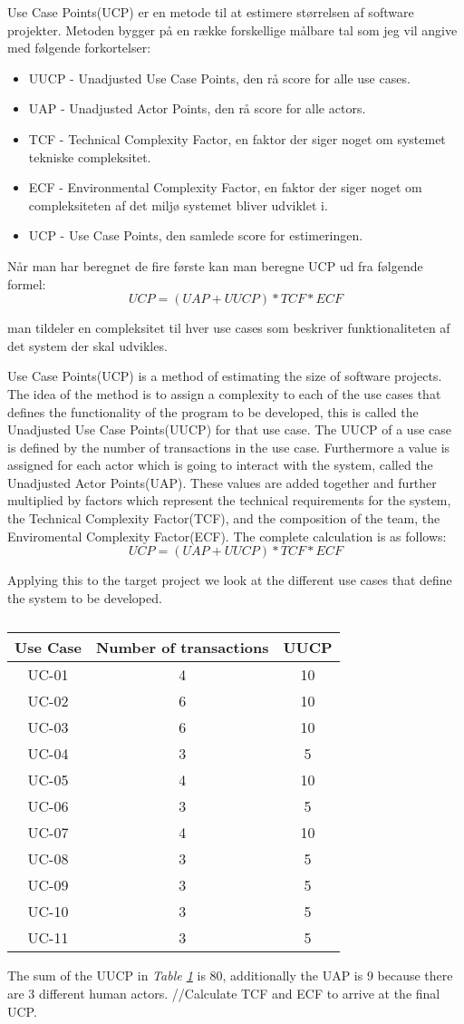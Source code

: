\documentclass[../report.tex]{subfiles}
\begin{document}
Use Case Points(UCP) er en metode til at estimere størrelsen af software projekter. Metoden bygger på en række forskellige målbare tal som jeg vil angive med følgende forkortelser:
\begin{itemize}
\item UUCP - Unadjusted Use Case Points, den rå score for alle use cases.
\item UAP - Unadjusted Actor Points, den rå score for alle actors.
\item TCF - Technical Complexity Factor, en faktor der siger noget om systemet tekniske compleksitet.
\item ECF - Environmental Complexity Factor, en faktor der siger noget om compleksiteten af det miljø systemet bliver udviklet i.
\item UCP - Use Case Points, den samlede score for estimeringen.
\end{itemize}
Når man har beregnet de fire første kan man beregne UCP ud fra følgende formel:\[UCP = (UAP + UUCP)*TCF*ECF\]

man tildeler en compleksitet til hver use cases som beskriver funktionaliteten af det system der skal udvikles. 

Use Case Points(UCP) is a method of estimating the size of software projects. The idea of the method is to assign a complexity to each of the use cases that defines the functionality of the  program to be developed, this is called the Unadjusted Use Case Points(UUCP) for that use case. The UUCP of a use case is defined by the number of transactions in the use case. Furthermore a value is assigned for each actor which is going to interact with the system, called the Unadjusted Actor Points(UAP). These values are added together and further multiplied by factors which represent the technical requirements for the system, the Technical Complexity Factor(TCF), and the composition of the team, the Enviromental Complexity Factor(ECF). The complete calculation is as follows: \[UCP = (UAP + UUCP)*TCF*ECF\] 

Applying this to the target project we look at the different use cases that define the system to be developed. 
\begin{table}[!h] 
\begin{tabular}{|c|c|c|}
\hline Use Case & Number of transactions & UUCP  \\ 
\hline UC-01 & 4 & 10  \\ 
\hline UC-02 & 6 & 10 \\
\hline UC-03 & 6 & 10 \\
\hline UC-04 & 3 & 5 \\
\hline UC-05 & 4 & 10 \\
\hline UC-06 & 3 & 5 \\
\hline UC-07 & 4 & 10 \\
\hline UC-08 & 3 & 5 \\
\hline UC-09 & 3 & 5 \\
\hline UC-10 & 3 & 5 \\
\hline UC-11 & 3 & 5 \\
\hline
\end{tabular}
\caption{} \label{tab:UUCP}
\end{table}

The sum of the UUCP in \textit{Table \ref{tab:UUCP}} is 80, additionally the UAP is 9 because there are 3 different human actors. 
//Calculate TCF and ECF to arrive at the final UCP.
\end{document}
